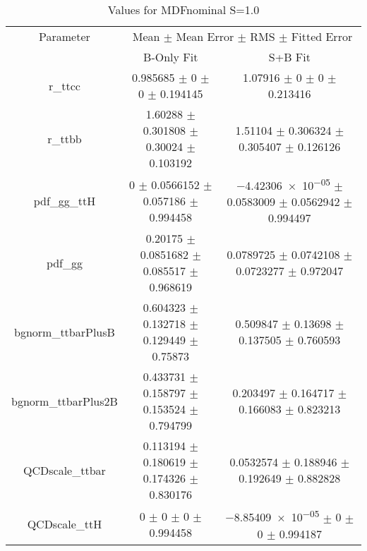 \begin{table}
\centering
\caption{Values for MDFnominal S=1.0}
\begin{tabular}{ccc}
\toprule
Parameter & \multicolumn{2}{c}{Mean $\pm$ Mean Error $\pm$ RMS $\pm$ Fitted Error}\\
 & B-Only Fit & S+B Fit\\
\midrule
r\_ttcc & \num{0.985685} $\pm$ \num{0} $\pm$ \num{0} $\pm$ \num{0.194145} & \num{1.07916} $\pm$ \num{0} $\pm$ \num{0} $\pm$ \num{0.213416}\\
r\_ttbb & \num{1.60288} $\pm$ \num{0.301808} $\pm$ \num{0.30024} $\pm$ \num{0.103192} & \num{1.51104} $\pm$ \num{0.306324} $\pm$ \num{0.305407} $\pm$ \num{0.126126}\\
pdf\_gg\_ttH & \num{0} $\pm$ \num{0.0566152} $\pm$ \num{0.057186} $\pm$ \num{0.994458} & \num{-4.42306e-05} $\pm$ \num{0.0583009} $\pm$ \num{0.0562942} $\pm$ \num{0.994497}\\
pdf\_gg & \num{0.20175} $\pm$ \num{0.0851682} $\pm$ \num{0.085517} $\pm$ \num{0.968619} & \num{0.0789725} $\pm$ \num{0.0742108} $\pm$ \num{0.0723277} $\pm$ \num{0.972047}\\
bgnorm\_ttbarPlusB & \num{0.604323} $\pm$ \num{0.132718} $\pm$ \num{0.129449} $\pm$ \num{0.75873} & \num{0.509847} $\pm$ \num{0.13698} $\pm$ \num{0.137505} $\pm$ \num{0.760593}\\
bgnorm\_ttbarPlus2B & \num{0.433731} $\pm$ \num{0.158797} $\pm$ \num{0.153524} $\pm$ \num{0.794799} & \num{0.203497} $\pm$ \num{0.164717} $\pm$ \num{0.166083} $\pm$ \num{0.823213}\\
QCDscale\_ttbar & \num{0.113194} $\pm$ \num{0.180619} $\pm$ \num{0.174326} $\pm$ \num{0.830176} & \num{0.0532574} $\pm$ \num{0.188946} $\pm$ \num{0.192649} $\pm$ \num{0.882828}\\
QCDscale\_ttH & \num{0} $\pm$ \num{0} $\pm$ \num{0} $\pm$ \num{0.994458} & \num{-8.85409e-05} $\pm$ \num{0} $\pm$ \num{0} $\pm$ \num{0.994187}\\
\bottomrule
\end{tabular}
\end{table}